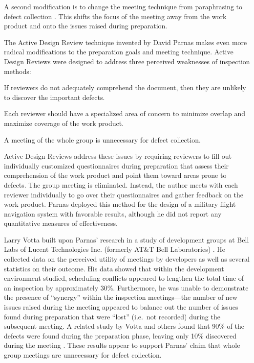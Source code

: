 A second modification is to change the meeting technique from paraphrasing
to defect collection \cite{Gilb93,Humphrey90}.  This shifts the focus of the
meeting away from the work product and onto the issues raised during
preparation. 

The Active Design Review technique \cite{Parnas85} invented by David Parnas
makes even more radical modifications to the preparation goals and meeting
technique. Active Design Reviews were designed to address three perceived
weaknesses of inspection methods:

\begin{smallitem}
\item If reviewers do not adequately comprehend the document, then they are
      unlikely to discover the important defects. 
\item Each reviewer should have a specialized area of concern to minimize 
      overlap and maximize coverage of the work product.
\item A meeting of the whole group is unnecessary for defect collection. 
\end{smallitem}

Active Design Reviews address these issues by requiring reviewers to fill
out individually customized questionnaires during preparation that assess
their comprehension of the work product and point them toward areas prone
to defects.  The group meeting is eliminated. Instead, the author meets
with each reviewer individually to go over their questionnaires and gather
feedback on the work product. Parnas deployed this method for the design
of a military flight navigation system with favorable results, although he
did not report any quantitative measures of effectiveness.

Larry Votta built upon Parnas' research in a study of development groups at 
Bell Labs of Lucent Technologies Inc. (formerly AT\&T Bell Laboratories)
\cite{Votta93}.  He collected data on the perceived utility of
meetings by developers as well as several statistics on their outcome. His
data showed that within the development environment studied, scheduling
conflicts appeared to lengthen the total time of an inspection by
approximately 30\%.  Furthermore, he was unable to demonstrate the presence
of ``synergy'' within the inspection meetings---the number of new issues
raised during the meeting appeared to balance out the number of issues
found during preparation that were ``lost'' (i.e.~not recorded) during the
subsequent meeting.  A related study by Votta and others found that 90\% of
the defects were found during the preparation phase, leaving only 10\%
discovered during the meeting \cite{Eick92}.  These results appear to
support Parnas' claim that whole group meetings are unnecessary for defect
collection.

